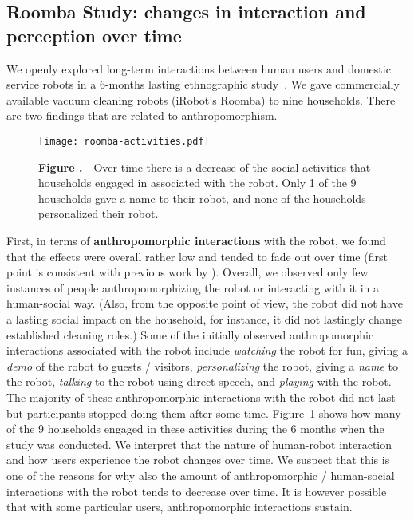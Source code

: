 \documentclass{frontiersSCNS} %
\begin{document}
%
%
%
%
%
%

\subsection{Roomba Study: changes in interaction and perception over time}
\label{sec:roomba-study}

We openly explored long-term interactions between human users and domestic
service robots in a 6-months lasting ethnographic study~\citep{fink_living_2013}. 
We gave commercially
available vacuum cleaning robots (iRobot's Roomba) to nine households.
There are two findings that are related to anthropomorphism.

\begin{figure}
\begin{center}
\texttt{[image: roomba-activities.pdf]}%
\end{center}
 \textbf{\label{fig:roomba-activities} Figure .}{~~\small Over time there is a decrease of the social activities that households engaged in associated with the robot. Only 1 of the 9 households gave a name to their robot, and none of the households personalized their robot.}
\end{figure}

First, in terms of \textbf{anthropomorphic interactions} with the robot, we found that the effects were overall rather low and tended to fade out over time (first point is consistent with previous work by \cite{sung_housewives_2008}). Overall, we observed only few instances of people anthropomorphizing the robot or interacting with it in a human-social way. (Also, from the opposite point of view, the robot did not have a lasting social impact on the household, for instance, it did not lastingly change established cleaning roles.)
Some of the initially observed anthropomorphic interactions associated with the robot include \textit{watching} the robot for fun, giving a \textit{demo} of the robot to guests / visitors, \textit{personalizing} the robot, giving a \textit{name} to the robot, \textit{talking} to the robot using direct speech, and \textit{playing} with the robot. 
The majority of these anthropomorphic interactions with the robot did not last but participants stopped doing them after some time. Figure~\ref{fig:roomba-activities} shows how many of the 9 households engaged
in these activities during the 6 months when the study was conducted. We interpret that the nature of
human-robot interaction and how users experience the robot changes over time. We suspect that this is one of the reasons for why also the amount of
anthropomorphic / human-social interactions with the robot tends to decrease over
time. It is however possible that with some particular users, anthropomorphic interactions sustain.
\end{document}
